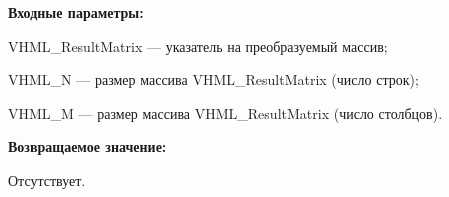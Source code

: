 \textbf{Входные параметры:}
 
VHML\_ResultMatrix --- указатель на преобразуемый массив;
 
VHML\_N --- размер массива VHML\_ResultMatrix (число строк);
 
VHML\_M --- размер массива VHML\_ResultMatrix (число столбцов). 

\textbf{Возвращаемое значение:}

Отсутствует.